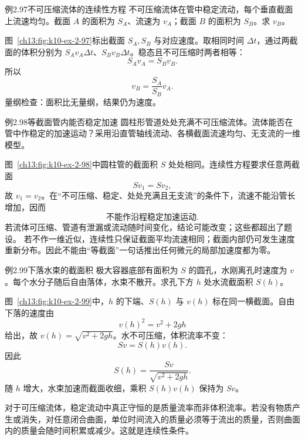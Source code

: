 \begin{origexamplebox}{例2.97\quad 不可压缩流体的连续性方程}
不可压缩流体在管中稳定流动，每个垂直截面上流速均匀。截面 $A$ 的面积为 $S_A$、流速为 $v_A$；截面 $B$ 的面积为 $S_B$。求 $v_B$。

\PipeContinuityDiagram
\end{origexamplebox}
\begin{xesolution}
图~\ref{ch13:fig:k10-ex-2-97}标出截面 $S_A,S_B$ 与对应速度。取相同时间 $\Delta t$，通过两截面的体积分别为 $S_Av_A\Delta t$、$S_Bv_B\Delta t$。稳态且不可压缩时两者相等：
\[
S_Av_A=S_Bv_B.
\]
所以
\[
\boxed{v_B=\frac{S_A}{S_B}v_A}.
\]
量纲检查：面积比无量纲，结果仍为速度。
\end{xesolution}

\begin{origexamplebox}{例2.98\quad 等截面管内能否稳定加速}
圆柱形管道处处充满不可压缩流体。流体能否在管中作稳定的加速运动？采用沿直管轴线流动、各横截面流速均匀、无支流的一维模型。

\UniformPipeDiagram
\end{origexamplebox}
\begin{xesolution}
图~\ref{ch13:fig:k10-ex-2-98}中圆柱管的截面积 $S$ 处处相同。连续性方程要求任意两截面
\[
Sv_1=Sv_2,
\]
故 $v_1=v_2$。在“不可压缩、稳定、处处充满且无支流”的条件下，流速不能沿管长增加，因而
\[
\boxed{\text{不能作沿程稳定加速运动}}.
\]
若流体可压缩、管道有泄漏或流动随时间变化，结论可能改变；这些都超出了题设。
若不作一维近似，连续性只保证截面平均流速相同；截面内部仍可发生速度重新分布。因此不能由“等截面”一句话推出任何微元的局部加速度都为零。
\end{xesolution}

\begin{origexamplebox}{例2.99\quad 下落水束的截面积}
极大容器底部有面积为 $S$ 的圆孔，水刚离孔时速度为 $v$。每个水分子随后自由落体，水束不散开。求孔下方 $h$ 处水流截面积 $S(h)$。

\FallingJetDiagram
\end{origexamplebox}
\begin{xesolution}
图~\ref{ch13:fig:k10-ex-2-99}中，$h$ 的下端、$S(h)$ 与 $v(h)$ 标在同一横截面。自由下落的速度由
\[
v(h)^2=v^2+2gh
\]
给出，故 $v(h)=\sqrt{v^2+2gh}$。水不可压缩，体积流率不变：
\[
Sv=S(h)v(h).
\]
因此
\[
\boxed{S(h)=\frac{Sv}{\sqrt{v^2+2gh}}}.
\]
随 $h$ 增大，水束加速而截面收细，乘积 $S(h)v(h)$ 保持为 $Sv$。
\end{xesolution}

对于可压缩流体，稳定流动中真正守恒的是质量流率而非体积流率。若没有物质产生或消失，对任意闭合曲面，单位时间流入的质量必须等于流出的质量，否则曲面内的质量会随时间积累或减少。这就是连续性条件。

